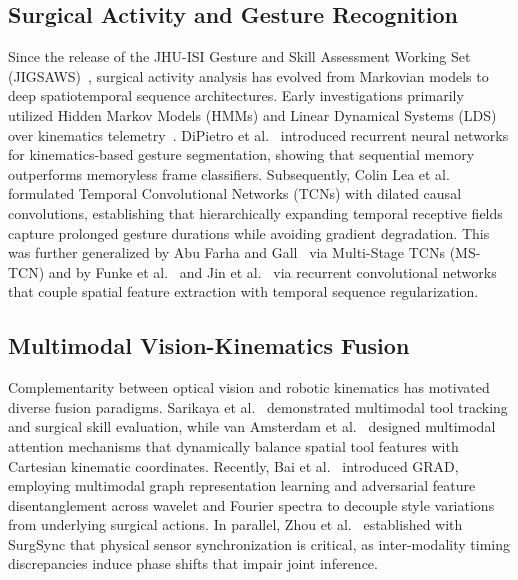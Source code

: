 \documentclass[10pt,journal]{IEEEtran}
\begin{document}
\subsection{Surgical Activity and Gesture Recognition}
Since the release of the JHU-ISI Gesture and Skill Assessment Working Set (JIGSAWS)~\cite{gao2014jigsaws, ahmidi2017dataset}, surgical activity analysis has evolved from Markovian models to deep spatiotemporal sequence architectures. Early investigations primarily utilized Hidden Markov Models (HMMs) and Linear Dynamical Systems (LDS) over kinematics telemetry~\cite{ahmidi2017dataset}. DiPietro et al.~\cite{dipietro2016recognizing} introduced recurrent neural networks for kinematics-based gesture segmentation, showing that sequential memory outperforms memoryless frame classifiers. Subsequently, Colin Lea et al.~\cite{lea2017temporal} formulated Temporal Convolutional Networks (TCNs) with dilated causal convolutions, establishing that hierarchically expanding temporal receptive fields capture prolonged gesture durations while avoiding gradient degradation. This was further generalized by Abu Farha and Gall~\cite{farha2019ms} via Multi-Stage TCNs (MS-TCN) and by Funke et al.~\cite{funke2019temporal} and Jin et al.~\cite{jin2020temporal} via recurrent convolutional networks that couple spatial feature extraction with temporal sequence regularization.

\subsection{Multimodal Vision-Kinematics Fusion}
Complementarity between optical vision and robotic kinematics has motivated diverse fusion paradigms. Sarikaya et al.~\cite{sarikaya2017surgical} demonstrated multimodal tool tracking and surgical skill evaluation, while van Amsterdam et al.~\cite{vanamsterdam2021gesture} designed multimodal attention mechanisms that dynamically balance spatial tool features with Cartesian kinematic coordinates. Recently, Bai et al.~\cite{bai2025grad} introduced GRAD, employing multimodal graph representation learning and adversarial feature disentanglement across wavelet and Fourier spectra to decouple style variations from underlying surgical actions. In parallel, Zhou et al.~\cite{zhou2026surgsync} established with SurgSync that physical sensor synchronization is critical, as inter-modality timing discrepancies induce phase shifts that impair joint inference.
\end{document}
